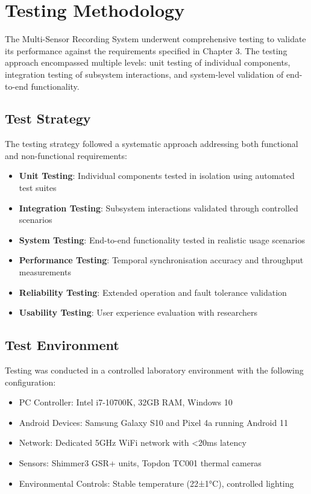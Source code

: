 \section{Testing Methodology}

The Multi-Sensor Recording System underwent comprehensive testing to validate its performance against the requirements specified in Chapter 3. The testing approach encompassed multiple levels: unit testing of individual components, integration testing of subsystem interactions, and system-level validation of end-to-end functionality.

\subsection{Test Strategy}

The testing strategy followed a systematic approach addressing both functional and non-functional requirements:

\begin{itemize}
\item \textbf{Unit Testing}: Individual components tested in isolation using automated test suites
\item \textbf{Integration Testing}: Subsystem interactions validated through controlled scenarios
\item \textbf{System Testing}: End-to-end functionality tested in realistic usage scenarios
\item \textbf{Performance Testing}: Temporal synchronisation accuracy and throughput measurements
\item \textbf{Reliability Testing}: Extended operation and fault tolerance validation
\item \textbf{Usability Testing}: User experience evaluation with researchers
\end{itemize}

\subsection{Test Environment}

Testing was conducted in a controlled laboratory environment with the following configuration:

\begin{itemize}
\item PC Controller: Intel i7-10700K, 32GB RAM, Windows 10
\item Android Devices: Samsung Galaxy S10 and Pixel 4a running Android 11
\item Network: Dedicated 5GHz WiFi network with <20ms latency
\item Sensors: Shimmer3 GSR+ units, Topdon TC001 thermal cameras
\item Environmental Controls: Stable temperature (22±1°C), controlled lighting
\end{itemize}

